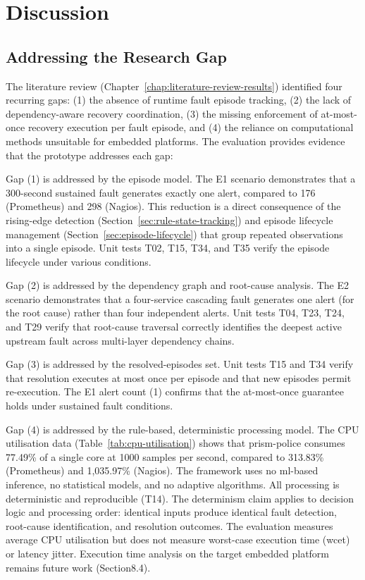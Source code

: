 \section{Discussion}\label{sec:eval-discussion}

\subsection{Addressing the Research Gap}

The literature review (Chapter~\ref{chap:literature-review-results}) identified four recurring gaps: (1) the absence of runtime fault episode tracking, (2) the lack of dependency-aware recovery coordination, (3) the missing enforcement of at-most-once recovery execution per fault episode, and (4) the reliance on computational methods unsuitable for embedded platforms. The evaluation provides evidence that the prototype addresses each gap:

Gap (1) is addressed by the episode model. The E1 scenario demonstrates that a 300-second sustained fault generates exactly one alert, compared to 176 (Prometheus) and 298 (Nagios). This reduction is a direct consequence of the rising-edge detection (Section~\ref{sec:rule-state-tracking}) and episode lifecycle management (Section~\ref{sec:episode-lifecycle}) that group repeated observations into a single episode. Unit tests T02, T15, T34, and T35 verify the episode lifecycle under various conditions.

Gap (2) is addressed by the dependency graph and root-cause analysis. The E2 scenario demonstrates that a four-service cascading fault generates one alert (for the root cause) rather than four independent alerts. Unit tests T04, T23, T24, and T29 verify that root-cause traversal correctly identifies the deepest active upstream fault across multi-layer dependency chains.

Gap (3) is addressed by the resolved-episodes set. Unit tests T15 and T34 verify that resolution executes at most once per episode and that new episodes permit re-execution. The E1 alert count (1) confirms that the at-most-once guarantee holds under sustained fault conditions.

Gap (4) is addressed by the rule-based, deterministic processing model. The CPU utilisation data (Table~\ref{tab:cpu-utilisation}) shows that prism-police consumes 77.49\% of a single core at 1000 samples per second, compared to 313.83\% (Prometheus) and 1,035.97\% (Nagios). The framework uses no \gls{ml}-based inference, no statistical models, and no adaptive algorithms. All processing is deterministic and reproducible (T14). The determinism claim applies to decision logic and processing order: identical inputs produce identical fault detection, root-cause identification, and resolution outcomes. The evaluation measures average CPU utilisation but does not measure worst-case execution time (\gls{wcet}) or latency jitter. Execution time analysis on the target embedded platform remains future work (Section8.4).

